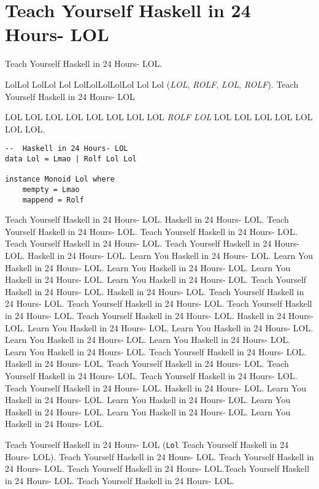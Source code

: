 \section{Teach Yourself Haskell in 24 Hours- LOL}

Teach Yourself Haskell in 24 Hours- LOL.

LolLol LolLol Lol LolLolLolLolLol Lol Lol (\emph{LOL}, \emph{ROLF}, \emph{LOL}, \emph{ROLF}). Teach Yourself Haskell in 24 Hours- LOL

LOL LOL LOL LOL LOL LOL LOL LOL \emph{ROLF LOL} LOL LOL LOL LOL LOL LOL LOL.

\begin{verbatim}
--  Haskell in 24 Hours- LOL
data Lol = Lmao | Rolf Lol Lol

instance Monoid Lol where
    mempty = Lmao
    mappend = Rolf

\end{verbatim}

Teach Yourself Haskell in 24 Hours- LOL.  Haskell in 24 Hours- LOL. Teach Yourself Haskell in 24 Hours- LOL. Teach Yourself Haskell in 24 Hours- LOL. Teach Yourself Haskell in 24 Hours- LOL. Teach Yourself Haskell in 24 Hours- LOL.  Haskell in 24 Hours- LOL. Learn You Haskell in 24 Hours- LOL. Learn You Haskell in 24 Hours- LOL. Learn You Haskell in 24 Hours- LOL. Learn You Haskell in 24 Hours- LOL. Learn You Haskell in 24 Hours- LOL.
Teach Yourself Haskell in 24 Hours- LOL.  Haskell in 24 Hours- LOL. Teach Yourself Haskell in 24 Hours- LOL. Teach Yourself Haskell in 24 Hours- LOL. Teach Yourself Haskell in 24 Hours- LOL. Teach Yourself Haskell in 24 Hours- LOL.  Haskell in 24 Hours- LOL. Learn You Haskell in 24 Hours- LOL. Learn You Haskell in 24 Hours- LOL. Learn You Haskell in 24 Hours- LOL. Learn You Haskell in 24 Hours- LOL. Learn You Haskell in 24 Hours- LOL.
Teach Yourself Haskell in 24 Hours- LOL.  Haskell in 24 Hours- LOL. Teach Yourself Haskell in 24 Hours- LOL. Teach Yourself Haskell in 24 Hours- LOL. Teach Yourself Haskell in 24 Hours- LOL. Teach Yourself Haskell in 24 Hours- LOL.  Haskell in 24 Hours- LOL. Learn You Haskell in 24 Hours- LOL. Learn You Haskell in 24 Hours- LOL. Learn You Haskell in 24 Hours- LOL. Learn You Haskell in 24 Hours- LOL. Learn You Haskell in 24 Hours- LOL.

Teach Yourself Haskell in 24 Hours- LOL (\texttt{Lol} Teach Yourself Haskell in 24 Hours- LOL). Teach Yourself Haskell in 24 Hours- LOL. Teach Yourself Haskell in 24 Hours- LOL. Teach Yourself Haskell in 24 Hours- LOL.Teach Yourself Haskell in 24 Hours- LOL. Teach Yourself Haskell in 24 Hours- LOL.

